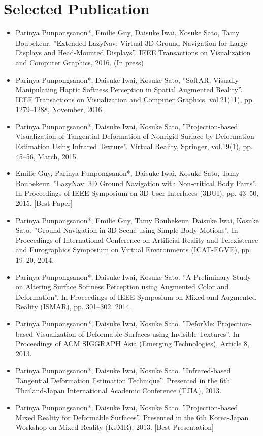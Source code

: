 \documentclass[]{resume-enhanced}
\begin{document}
\section{Selected Publication}
\begin{itemize}
\item
{
	Parinya Punpongsanon*, Emilie Guy, Daisuke Iwai, Kosuke Sato, Tamy Boubekeur, ''Extended LazyNav: Virtual 3D Ground Navigation for Large Displays and Head-Mounted Displays''. IEEE Transactions on Visualization and Computer Graphics, 2016. (In press)
}
\item
{
	Parinya Punpongsanon*, Daisuke Iwai, Kosuke Sato, ''SoftAR: Visually Manipulating Haptic Softness Perception in Spatial Augmented Reality''. IEEE Transactions on Visualization and Computer Graphics, vol.21(11), pp. 1279--1288, November, 2016.
}
\item
{
	Parinya Punpongsanon*, Daisuke Iwai, Kosuke Sato, ''Projection-based Visualization of Tangential Deformation of Nonrigid Surface by Deformation Estimation Using Infrared Texture''. Virtual Reality, Springer, vol.19(1), pp. 45--56, March, 2015.
}
\end{itemize}

\begin{itemize}
\item
{
	Emilie Guy, Parinya Punpongsanon*, Daisuke Iwai, Kosuke Sato, Tamy Boubekeur. ''LazyNav: 3D Ground Navigation with Non-critical Body Parts''. In Proceedings of IEEE Symposium on 3D User Interfaces (3DUI), pp. 43--50, 2015. [Best Paper]
}
\item
{
	Parinya Punpongsanon*, Emilie Guy, Tamy Boubekeur, Daisuke Iwai, Kosuke Sato. ''Ground Navigation in 3D Scene using Simple Body Motions''. In Proceedings of International Conference on Artificial Reality and Telexistence and Eurographics Symposium on Virtual Environments (ICAT-EGVE), pp. 19--20, 2014.
}
\item
{
	Parinya Punpongsanon*, Daisuke Iwai, Kosuke Sato. ''A Preliminary Study on Altering Surface Softness Perception using Augmented Color and Deformation''. In Proceedings of IEEE Symposium on Mixed and Augmented Reality (ISMAR), pp. 301--302, 2014.
}
\item
{
	Parinya Punpongsanon*, Daisuke Iwai, Kosuke Sato. ''DeforMe: Projection-based Visualization of Deformable Surfaces using Invisible Textures''. In Proceedings of ACM SIGGRAPH Asia (Emerging Technologies), Article 8, 2013.	
}
\item
{
	Parinya Punpongsanon*, Daisuke Iwai, Kosuke Sato. ''Infrared-based Tangential Deformation Estimation Technique''. Presented in the 6th Thailand-Japan International Academic Conference (TJIA), 2013.	
}
\item
{
	Parinya Punpongsanon*, Daisuke Iwai, Kosuke Sato. ''Projection-based Mixed Reality for Deformable Surfaces''. Presented in the 6th Korea-Japan Workshop on Mixed Reality (KJMR), 2013. [Best Presentation]	
}
\end{itemize}
\sectionsep
\end{document}

